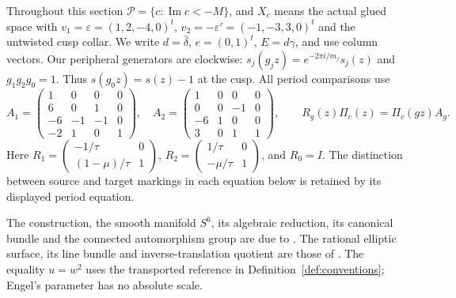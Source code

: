 \documentclass[11pt,a4paper]{article}
\theoremstyle{plain}
\theoremstyle{definition}
\begin{document}
Throughout this section $\mathcal P=\{c:\operatorname{Im}c<-M\}$, and $X_c$ means the actual glued space with $v_1=\varepsilon=(1,2,-4,0)^t$, $v_2=-\varepsilon'=(-1,-3,3,0)^t$ and the untwisted cusp collar. We write $d=\widehat\delta$, $e=(0,1)^t$, $E=d\gamma$, and use column vectors. Our peripheral generators are clockwise: $s_j(g_jz)=e^{-2\pi i/m_j}s_j(z)$ and $g_1g_2g_0=1$. Thus $s(g_0z)=s(z)-1$ at the cusp. All period comparisons use
\[
 A_1=\begin{pmatrix}1&0&0&0\\6&0&1&0\\-6&-1&-1&0\\-2&1&0&1\end{pmatrix},\quad
 A_2=\begin{pmatrix}1&0&0&0\\0&0&-1&0\\-6&1&0&0\\3&0&1&1\end{pmatrix},\qquad
 R_g(z)\Pi_c(z)=\Pi_c(gz)A_g.
\]
Here $R_1=\left(\begin{smallmatrix}-1/\tau&0\\(1-\mu)/\tau&1\end{smallmatrix}\right)$, $R_2=\left(\begin{smallmatrix}1/\tau&0\\-\mu/\tau&1\end{smallmatrix}\right)$, and $R_0=I$. The distinction between source and target markings in each equation below is retained by its displayed period equation.


The construction, the smooth manifold $S^6$, its algebraic reduction, its canonical bundle and the connected automorphism group are due to \cite[Main Theorem; Sections 3--9]{AC26}. The rational elliptic surface, its line bundle and inverse-translation quotient are those of \cite[Section 2]{E26}. The equality $u=w^2$ uses the transported reference in Definition~\ref{def:conventions}; Engel's parameter has no absolute scale.
\end{document}
